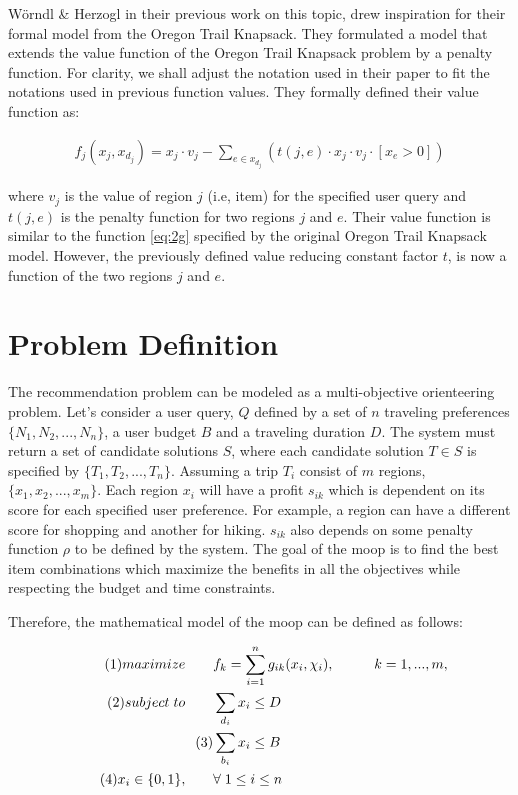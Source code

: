 Wörndl \& Herzogl\parencite{cbrecsys2014} in their previous work on this topic, drew inspiration for their formal model from the Oregon Trail Knapsack. They formulated a model that extends the value function of the Oregon Trail Knapsack problem by a penalty function. For clarity, we shall adjust the notation used in their paper to fit the notations used in previous function values. They formally defined their value function as:

\begin{gather*}
 f_j(x_j, x_{d_j}) = x_j \cdot v_j - \sum_{e \in x_{d_j}} ( t(j, e) \cdot x_j \cdot v_j \cdot [x_e > 0])
\end{gather*}

where $v_j$ is the value of region $j$ (i.e, item) for the specified user query and $t(j, e)$ is the penalty function for two regions $j$ and $e$. Their value function is similar to the function \ref{eq:2g} specified by the original Oregon Trail Knapsack model. However, the previously defined value reducing constant factor $t$, is now a function of the two regions  $j$ and $e$. 

\section{Problem Definition} \label{sec:problem_definition}
The recommendation problem can be modeled as a multi-objective orienteering problem. Let's consider a user query, $Q$ defined by a set of $n$ traveling preferences $\{N_1, N_2,...,N_n\}$, a user budget $B$ and a traveling duration $D$. The system must return a set of \glspl{candidate solution} $S$, where each \gls{candidate solution} $T \in S$ is specified by $\{T_1, T_2,...,T_n\}$. Assuming a trip $T_i$ consist of $m$ regions, $\{x_1, x_2,...,x_m\}$. Each region $x_i$ will have a profit $s_{ik}$ which is dependent on its score for each specified user preference. For example, a region can have a different score for shopping and another for hiking. $s_{ik}$ also depends on some penalty function $\rho$ to be defined by the system.
The goal of the \gls{moop} is to find the best item combinations which maximize the benefits in all the objectives while respecting the budget and time constraints. 

Therefore, the mathematical model of the \gls{moop} can be defined as follows:

\begin{align}
    \tag{1}maximize \qquad  &f_k = \sum_{i=1}^n g_{ik}(x_i, \chi_{i}), \hspace{1cm} k = 1,...,m,\label{eq:3a}\\
    \tag{2}subject\hspace{0.1cm} to \qquad &\sum_{d_i} x_i \leq D \label{eq:3b}\\
    \tag{3} &\sum_{b_i} x_i \leq B \label{eq:3c}\\
    \tag{4} x_i \in \{0,1\}, \qquad &\forall \hspace{0.1cm} 1 \leq i \leq n
\end{align}


